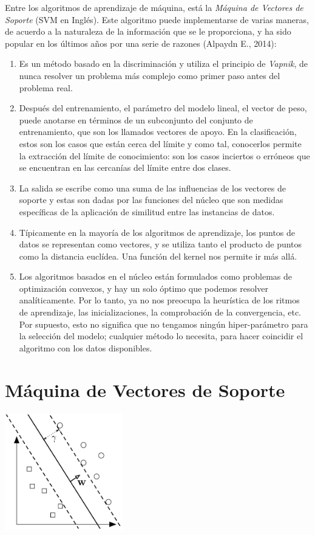 Entre los algoritmos de aprendizaje de máquina, está la \textit{Máquina de Vectores de Soporte} (SVM en Inglés). Este algoritmo puede implementarse de varias maneras, de acuerdo a la naturaleza de la información que se le proporciona, y ha sido popular en los últimos años por una serie de razones (Alpaydn E., 2014): 
\begin{enumerate}
\item Es un método basado en la discriminación y utiliza el principio de \textit{Vapnik}, de nunca resolver un problema más complejo como primer paso antes del problema real. 
\item Después del entrenamiento, el parámetro del modelo lineal, el vector de peso, puede anotarse en términos de un subconjunto del conjunto de entrenamiento, que son los llamados vectores de apoyo. En la clasificación, estos son los casos que están cerca del límite y como tal, conocerlos permite la extracción del límite de conocimiento: son los casos inciertos o erróneos que se encuentran en las cercanías del límite entre dos clases.  
\item La salida se escribe como una suma de las influencias de los vectores de soporte y estas son dadas por las funciones del núcleo que son medidas específicas de la aplicación de similitud entre las instancias de datos. 
\item Típicamente en la mayoría de los algoritmos de aprendizaje, los puntos de datos se representan como vectores, y se utiliza tanto el producto de puntos como la distancia euclídea.  Una función del kernel nos permite ir más allá. 
\item Los algoritmos basados en el núcleo están formulados como problemas de optimización convexos, y hay un solo óptimo que podemos resolver analíticamente. Por lo tanto, ya no nos preocupa la heurística de los ritmos de aprendizaje, las inicializaciones, la comprobación de la convergencia, etc. Por supuesto, esto no significa que no tengamos ningún hiper-parámetro para la selección del modelo; cualquier método lo necesita, para hacer coincidir el algoritmo con los datos disponibles.
\end{enumerate}

\section{Máquina de Vectores de Soporte}

\begin{center}
\includegraphics[height=2.0in]{figuras/Capture1.PNG}
\end{center}


